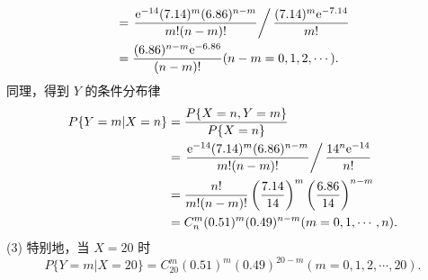 \begin{solution}
$$\begin{aligned}
             & = \left. \frac{\mathrm{e}^{-14}(7.14)^m(6.86)^{n-m}}{m!(n-m)!} \right/ \frac{(7.14)^m\mathrm{e}^{-7.14}}{m!} \\
             & = \frac{(6.86)^{n-m}\mathrm{e}^{-6.86}}{(n-m)!}
            (n-m = 0, 1, 2, \cdots).
        \end{aligned}
    $$
    同理，得到 $Y$ 的条件分布律
    $$
        \begin{aligned}
            P\{Y=m|X=n\}
             & = \frac{P\{X=n,Y=m\}}{P\{X=n\}}                                                                       \\
             & = \left.\frac{\mathrm{e}^{-14}(7.14)^m(6.86)^{n-m}}{m!(n-m)!} \right/ \frac{14^n\mathrm{e}^{-14}}{n!} \\
             & = \frac{n!}{m!(n-m)!}\left(\frac{7.14}{14}\right)^m\left(\frac{6.86}{14}\right)^{n-m}                 \\
             & = C_n^m(0.51)^m(0.49)^{n-m}
            (m = 0, 1, \cdots, n).
        \end{aligned}
    $$
    (3) 特别地，当 $X=20$ 时
    $$
        P\{Y=m|X=20\} = C_{20}^{m} (0.51)^m(0.49)^{20-m}
        (m = 0, 1, 2, \cdots, 20).
    $$
\end{solution}


